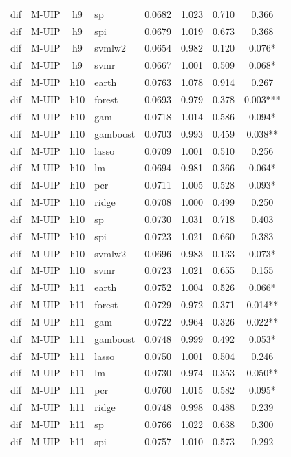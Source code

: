 \begin{ThreePartTable}
\begin{longtable}[t]{llclcccc}
dif & M-UIP & h9 & sp & 0.0682 & 1.023 & 0.710 & 0.366\\
dif & M-UIP & h9 & spi & 0.0679 & 1.019 & 0.673 & 0.368\\
dif & M-UIP & h9 & svmlw2 & 0.0654 & 0.982 & 0.120 & 0.076*\\
dif & M-UIP & h9 & svmr & 0.0667 & 1.001 & 0.509 & 0.068*\\
\addlinespace
dif & M-UIP & h10 & earth & 0.0763 & 1.078 & 0.914 & 0.267\\
dif & M-UIP & h10 & forest & 0.0693 & 0.979 & 0.378 & 0.003***\\
dif & M-UIP & h10 & gam & 0.0718 & 1.014 & 0.586 & 0.094*\\
dif & M-UIP & h10 & gamboost & 0.0703 & 0.993 & 0.459 & 0.038**\\
dif & M-UIP & h10 & lasso & 0.0709 & 1.001 & 0.510 & 0.256\\
dif & M-UIP & h10 & lm & 0.0694 & 0.981 & 0.366 & 0.064*\\
dif & M-UIP & h10 & pcr & 0.0711 & 1.005 & 0.528 & 0.093*\\
dif & M-UIP & h10 & ridge & 0.0708 & 1.000 & 0.499 & 0.250\\
dif & M-UIP & h10 & sp & 0.0730 & 1.031 & 0.718 & 0.403\\
dif & M-UIP & h10 & spi & 0.0723 & 1.021 & 0.660 & 0.383\\
dif & M-UIP & h10 & svmlw2 & 0.0696 & 0.983 & 0.133 & 0.073*\\
dif & M-UIP & h10 & svmr & 0.0723 & 1.021 & 0.655 & 0.155\\
\addlinespace
dif & M-UIP & h11 & earth & 0.0752 & 1.004 & 0.526 & 0.066*\\
dif & M-UIP & h11 & forest & 0.0729 & 0.972 & 0.371 & 0.014**\\
dif & M-UIP & h11 & gam & 0.0722 & 0.964 & 0.326 & 0.022**\\
dif & M-UIP & h11 & gamboost & 0.0748 & 0.999 & 0.492 & 0.053*\\
dif & M-UIP & h11 & lasso & 0.0750 & 1.001 & 0.504 & 0.246\\
dif & M-UIP & h11 & lm & 0.0730 & 0.974 & 0.353 & 0.050**\\
dif & M-UIP & h11 & pcr & 0.0760 & 1.015 & 0.582 & 0.095*\\
dif & M-UIP & h11 & ridge & 0.0748 & 0.998 & 0.488 & 0.239\\
dif & M-UIP & h11 & sp & 0.0766 & 1.022 & 0.638 & 0.300\\
dif & M-UIP & h11 & spi & 0.0757 & 1.010 & 0.573 & 0.292\\

\end{longtable}
\end{ThreePartTable}
